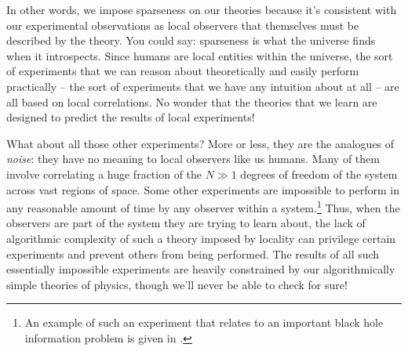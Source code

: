 \documentclass[12pt]{article}
\begin{document}
In other words, we impose sparseness on our theories because it's consistent with our experimental observations as local observers that themselves must be described by the theory. You could say: sparseness is what the universe finds when it introspects.
Since humans are local entities within the universe, the sort of experiments that we can reason about theoretically and easily perform practically -- the sort of experiments that we have any intuition about at all -- are all based on local correlations. No wonder that the theories that we learn are designed to predict the results of local experiments!













What about all those other experiments? More or less, they are the analogues of \emph{noise}: they have no meaning to local observers like us humans. Many of them involve correlating a huge fraction of the $N \gg 1$ degrees of freedom of the system across vast regions of space. Some other experiments are impossible to perform in any reasonable amount of time by any observer within a system.\footnote{An example of such an experiment that relates to an important black hole information problem \cite{Almheiri:2012rt} is given in \cite{Harlow:2013tf}.
}  
Thus, when the observers are part of the system they are trying to learn about, the lack of algorithmic complexity of such a theory imposed by locality can privilege certain experiments and prevent others from being performed. 
The results of all such essentially impossible experiments are heavily constrained by our algorithmically simple theories of physics, though we'll never be able to check for sure!
\end{document}
